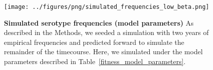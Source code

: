 \documentclass[11pt,oneside,letterpaper]{article}
\begin{document}
\begin{figure}[ht]
  \centering
  \texttt{[image: ../figures/png/simulated\_frequencies\_low\_beta.png]}
  \caption{\textbf{Simulated serotype frequencies (model parameters)}
  As described in the Methods, we seeded a simulation with two years of empirical frequencies and predicted forward to simulate the remainder of the timecourse.
  Here, we simulated under the model parameters described in Table~\ref{fitness_model_parameters}. }
\label{simulated_frequencies_low_beta}
\end{figure}
\end{document}
